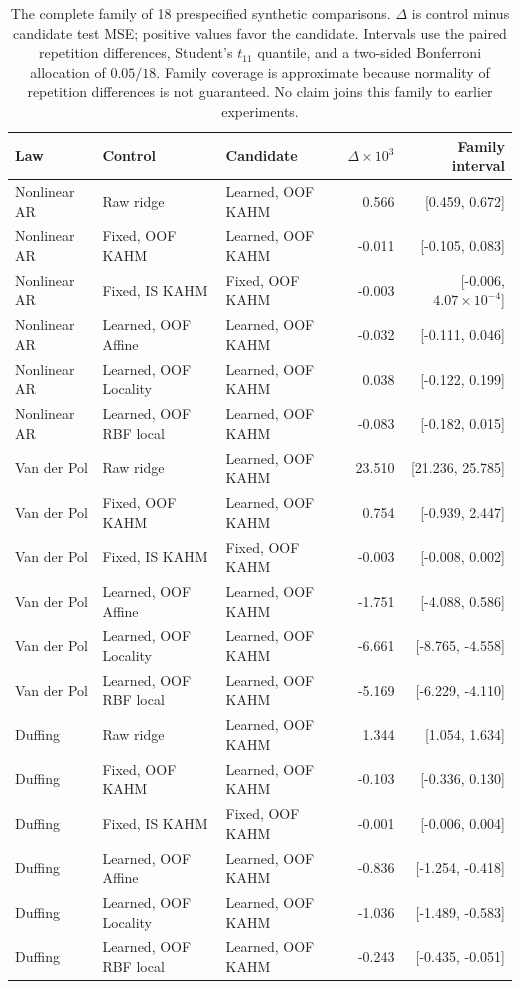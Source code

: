 \begin{table}[!htbp]
\centering\scriptsize\setlength{\tabcolsep}{4pt}
\caption{The complete family of 18 prespecified synthetic comparisons. $\Delta$ is control minus candidate test MSE; positive values favor the candidate. Intervals use the paired repetition differences, Student's $t_{11}$ quantile, and a two-sided Bonferroni allocation of $0.05/18$. Family coverage is approximate because normality of repetition differences is not guaranteed. No claim joins this family to earlier experiments.}
\label{tab:target-synthetic-intervals}
\begin{tabular}{lllrr}
\toprule
Law & Control & Candidate & $\Delta\times10^3$ & Family interval \\
\midrule
Nonlinear AR & Raw ridge & Learned, OOF KAHM & 0.566 & [0.459, 0.672] \\
Nonlinear AR & Fixed, OOF KAHM & Learned, OOF KAHM & -0.011 & [-0.105, 0.083] \\
Nonlinear AR & Fixed, IS KAHM & Fixed, OOF KAHM & -0.003 & [-0.006, $4.07\times10^{-4}$] \\
Nonlinear AR & Learned, OOF Affine & Learned, OOF KAHM & -0.032 & [-0.111, 0.046] \\
Nonlinear AR & Learned, OOF Locality & Learned, OOF KAHM & 0.038 & [-0.122, 0.199] \\
Nonlinear AR & Learned, OOF RBF local & Learned, OOF KAHM & -0.083 & [-0.182, 0.015] \\
Van der Pol & Raw ridge & Learned, OOF KAHM & 23.510 & [21.236, 25.785] \\
Van der Pol & Fixed, OOF KAHM & Learned, OOF KAHM & 0.754 & [-0.939, 2.447] \\
Van der Pol & Fixed, IS KAHM & Fixed, OOF KAHM & -0.003 & [-0.008, 0.002] \\
Van der Pol & Learned, OOF Affine & Learned, OOF KAHM & -1.751 & [-4.088, 0.586] \\
Van der Pol & Learned, OOF Locality & Learned, OOF KAHM & -6.661 & [-8.765, -4.558] \\
Van der Pol & Learned, OOF RBF local & Learned, OOF KAHM & -5.169 & [-6.229, -4.110] \\
Duffing & Raw ridge & Learned, OOF KAHM & 1.344 & [1.054, 1.634] \\
Duffing & Fixed, OOF KAHM & Learned, OOF KAHM & -0.103 & [-0.336, 0.130] \\
Duffing & Fixed, IS KAHM & Fixed, OOF KAHM & -0.001 & [-0.006, 0.004] \\
Duffing & Learned, OOF Affine & Learned, OOF KAHM & -0.836 & [-1.254, -0.418] \\
Duffing & Learned, OOF Locality & Learned, OOF KAHM & -1.036 & [-1.489, -0.583] \\
Duffing & Learned, OOF RBF local & Learned, OOF KAHM & -0.243 & [-0.435, -0.051] \\
\bottomrule
\end{tabular}
\end{table}
